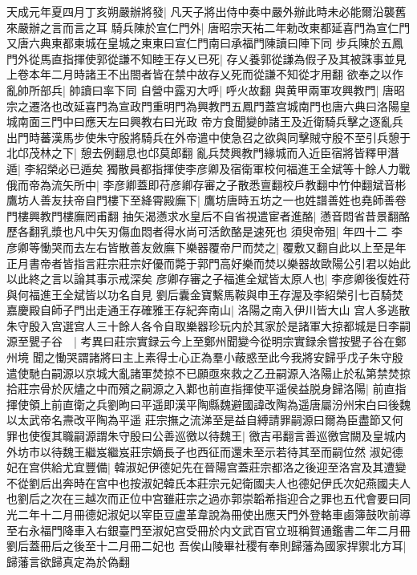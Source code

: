 天成元年夏四月丁亥朔嚴辦將發|{
	凡天子將出侍中奏中嚴外辦此時未必能爾沿襲舊來嚴辦之言而言之耳}
騎兵陳於宣仁門外|{
	唐昭宗天祐二年勅改東都延喜門為宣仁門又唐六典東都東城在皇城之東東曰宣仁門南曰承福門陳讀曰陣下同}
步兵陳於五鳳門外從馬直指揮使郭從謙不知睦王存乂已死|{
	存乂養郭從謙為假子及其被誅事並見上卷本年二月時諸王不出閤者皆在禁中故存乂死而從謙不知從才用翻}
欲奉之以作亂帥所部兵|{
	帥讀曰率下同}
自營中露刃大呼|{
	呼火故翻}
與黄甲兩軍攻興教門|{
	唐昭宗之遷洛也改延喜門為宣政門重明門為興教門五鳳門蓋宫城南門也唐六典曰洛陽皇城南面三門中曰應天左曰興教右曰光政}
帝方食聞變帥諸王及近衛騎兵擊之逐亂兵出門時蕃漢馬步使朱守殷將騎兵在外帝遣中使急召之欲與同擊賊守殷不至引兵憩于北邙茂林之下|{
	憩去例翻息也邙莫郎翻}
亂兵焚興教門緣城而入近臣宿將皆釋甲潛遁|{
	李紹榮必已遁矣}
獨散員都指揮使李彦卿及宿衛軍校何福進王全斌等十餘人力戰俄而帝為流矢所中|{
	李彦卿蓋即苻彦卿存審之子散悉亶翻校戶教翻中竹仲翻斌音彬}
鷹坊人善友扶帝自門樓下至絳霄殿廡下|{
	鷹坊唐時五坊之一也姓譜善姓也堯師善卷門樓興教門樓廡罔甫翻}
抽矢渴懣求水皇后不自省視遣宦者進酪|{
	懣音悶省昔景翻酪歷各翻乳漿也凡中矢刃傷血悶者得水尚可活飲酪是速死也}
須臾帝殂|{
	年四十二}
李彦卿等慟哭而去左右皆散善友斂廡下樂器覆帝尸而焚之|{
	覆敷又翻自此以上至是年正月書帝者皆指言莊宗莊宗好優而斃于郭門高好樂而焚以樂器故歐陽公引君以始此以此終之言以論其事示戒深矣}
彦卿存審之子福進全斌皆太原人也|{
	李彦卿後復姓苻與何福進王全斌皆以功名自見}
劉后囊金寶繫馬鞍與申王存渥及李紹榮引七百騎焚嘉慶殿自師子門出走通王存確雅王存紀奔南山|{
	洛陽之南入伊川皆大山}
宫人多逃散朱守殷入宫選宫人三十餘人各令自取樂器珍玩内於其家於是諸軍大掠都城是日李嗣源至甖子谷　|{
	考異曰莊宗實録云今上至鄭州聞變今從明宗實録余嘗按甖子谷在鄭州境}
聞之慟哭謂諸將曰主上素得士心正為羣小蔽惑至此今我將安歸乎戊子朱守殷遣使馳白嗣源以京城大亂諸軍焚掠不已願亟來救之乙丑嗣源入洛陽止於私第禁焚掠拾莊宗骨於灰燼之中而殯之嗣源之入鄴也前直指揮使平遥侯益脱身歸洛陽|{
	前直指揮使領上前直衛之兵劉昫曰平遥即漢平陶縣魏避國諱改陶為遥唐屬汾州宋白曰後魏以太武帝名燾改平陶為平遥}
莊宗撫之流涕至是益自縛請罪嗣源曰爾為臣盡節又何罪也使復其職嗣源謂朱守殷曰公善巡徼以待魏王|{
	徼吉弔翻言善巡徼宫闕及皇城内外坊市以待魏王繼岌繼岌莊宗嫡長子也西征而還未至示若待其至而嗣位然}
淑妃德妃在宫供給尤宜豐備|{
	韓淑妃伊德妃先在晉陽宫蓋莊宗都洛之後迎至洛宫及其遭變不從劉后出奔時在宫中也按淑妃韓氏本莊宗元妃衛國夫人也德妃伊氏次妃燕國夫人也劉后之次在三越次而正位中宫雖莊宗之過亦郭崇韜希指迎合之罪也五代會要曰同光二年十二月冊德妃淑妃以宰臣豆盧革韋說為冊使出應天門外登輅車鹵簿鼓吹前導至右永福門降車入右銀臺門至淑妃宫受冊於内文武百官立班稱賀通鑑書二年二月冊劉后蓋冊后之後至十二月冊二妃也}
吾俟山陵畢社稷有奉則歸藩為國家捍禦北方耳|{
	歸藩言欲歸真定為於偽翻}
